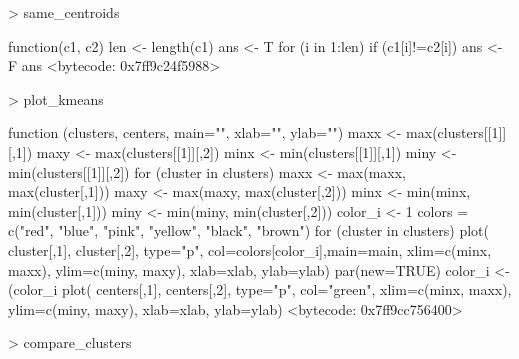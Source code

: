 \documentclass [a4paper] {article}
\begin{document}
\begin{Schunk}
\begin{Soutput}
\end{Soutput}
\begin{Sinput}
> same_centroids
\end{Sinput}
\begin{Soutput}
function(c1, c2){
  len <- length(c1)
  ans <- T
  for (i in 1:len){
    if (c1[i]!=c2[i]){
      ans <- F
    }
  }
  ans
}
<bytecode: 0x7ff9c24f5988>
\end{Soutput}
\begin{Sinput}
> plot_kmeans
\end{Sinput}
\begin{Soutput}
function (clusters, centers, main="", xlab="", ylab="") {
  maxx <- max(clusters[[1]][,1])
  maxy <- max(clusters[[1]][,2])
  minx <- min(clusters[[1]][,1])
  miny <- min(clusters[[1]][,2])
  for (cluster in clusters){
    maxx <- max(maxx, max(cluster[,1]))
    maxy <- max(maxy, max(cluster[,2]))
    minx <- min(minx, min(cluster[,1]))
    miny <- min(miny, min(cluster[,2]))
  }
  color_i <- 1
  colors = c("red", "blue", "pink", "yellow", "black", "brown")
  for (cluster in clusters){
    plot( cluster[,1], cluster[,2], type="p", col=colors[color_i],main=main,
          xlim=c(minx, maxx), ylim=c(miny, maxy), xlab=xlab, ylab=ylab)
    par(new=TRUE)
    color_i <- (color_i%
  }
  plot( centers[,1], centers[,2], type="p", col="green",
        xlim=c(minx, maxx), ylim=c(miny, maxy), xlab=xlab, ylab=ylab)
}
<bytecode: 0x7ff9cc756400>
\end{Soutput}
\begin{Sinput}
> compare_clusters
\end{Sinput}
\end{Schunk}
\end{document}
